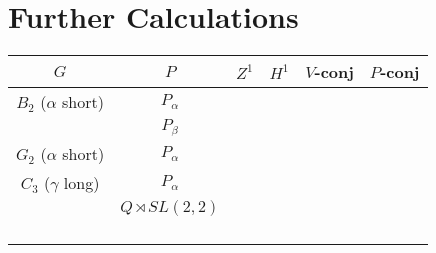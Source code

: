 
\chapter{Further Calculations}
\label{AppendixA}

\begin{tabular}{|c||c|c|c|c|c|}
	\hline
	$G$ & $P$ & $Z^1$ & $H^1$ & $V$-conj & $P$-conj \\
	\hline
	$B_2$ ($\alpha$ short) & $P_\alpha$ & \checkmark & \checkmark & \checkmark & \checkmark \\
	\hline
	 & $P_\beta$ & \checkmark & \checkmark & \checkmark & \checkmark \\
	\hline
	$G_2$ ($\alpha$ short) & $P_\alpha$ & \checkmark &  &  &  \\
	\hline
	$C_3$ ($\gamma$ long) & $P_\alpha$ & \checkmark &  &  &  \\
	\hline
	\cite{slodowy1997two} & $Q \rtimes SL(2,2)$ & \checkmark & \checkmark & \checkmark &  \\
	\hline
	 &  &  &  &  &  \\
	\hline
	 &  &  &  &  &  \\
	\hline
	 &  &  &  &  &  \\
	\hline
	 &  &  &  &  &  \\
	\hline
\end{tabular}
